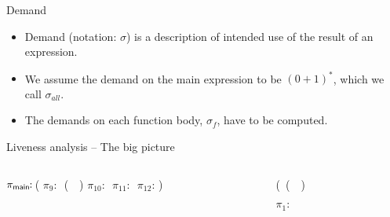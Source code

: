 \begin{frame}{Demand}
\begin{itemize}[<+->]
  \item Demand  (notation: $\sigma$) is a description  of intended use
    of the result of an expression.
  \item We assume the demand on the main expression to be $(0+1)^*$,
    which we call $\sigma_{all}$.
  \item The demands on each function body, $\sigma_f$, have to be computed.
  \end{itemize}
\end{frame}
\begin{frame}[t]{Liveness analysis -- The big picture}
\vspace*{-10mm}
\begin{columns}[c]
 \begin{column}[T]{0.5\textwidth}
\hspace*{-.3cm}\renewcommand{\arraystretch}{1}{
	  \begin{uprogram}
	  \hspace*{-.2cm} $\pi_{\sf main}\!\!:\, $(\onslide<0>{\LET\  \pz\  $\leftarrow$ \ldots  \IN
	  \UNL{2}   \hspace*{.3cm}              (\LET\ \py\  $\leftarrow$  \ldots \IN}
             \hspace*{-.5cm}    $\pi_9\!\!:\, $  (\append\ \py\ \pz) 
             \hspace*{-.8cm}  $\pi_{10}\!\!:\, $
	     \hspace*{-1.1cm}  $\pi_{11}\!\!:\, $\onslide<0>{(\LET\ \pb\  $\leftarrow$ (\CAR\  \pa) \IN}
             \hspace*{-1.4cm} $\pi_{12}\!\!:\,$)
\end{uprogram}}
 \end{column}
 \begin{column}[T]{0.6\textwidth}
\hspace*{.4cm}  \renewcommand{\arraystretch}{1}{
  \begin{uprogram}
    \hspace*{-.7cm} (\DEFINE\ (\append~\lista~\listb)

    \hspace*{-1cm}  $\pi_1\!\!:\, $



\end{uprogram}}
\end{column}
\end{columns}
\end{frame}
